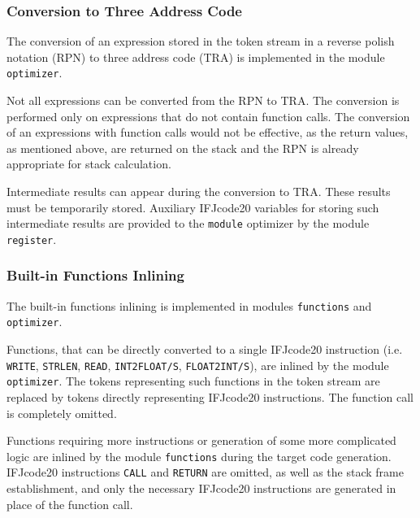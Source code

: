 \documentclass[12pt]{article}
\begin{document}
\subsubsection{Conversion to Three Address Code}
The conversion of an expression stored in the token stream in a reverse polish notation (RPN) to three address code (TRA) is implemented in the module \texttt{optimizer}. \par
Not all expressions can be converted from the RPN to TRA. The conversion is performed only on expressions that do not contain function calls. The conversion of an expressions with function calls would not be effective, as the return values, as mentioned above, are returned on the stack and the RPN is already appropriate for stack calculation.\par
Intermediate results can appear during the conversion to TRA. These results must be temporarily stored. Auxiliary IFJcode20 variables for storing such intermediate results are provided to the \texttt{module} optimizer by the module \texttt{register}. 
\subsubsection{Built-in Functions Inlining}
The built-in functions inlining is implemented in modules \texttt{functions} and \texttt{optimizer}. \par
Functions, that can be directly converted to a single IFJcode20 instruction (i.e. \texttt{WRITE}, \texttt{STRLEN}, \texttt{READ}, \texttt{INT2FLOAT/S}, \texttt{FLOAT2INT/S}), are inlined by the module \texttt{optimizer}. The tokens representing such functions in the token stream are replaced by tokens directly representing IFJcode20 instructions. The function call is completely omitted. \par
Functions requiring more instructions or generation of  some more complicated logic are inlined by the module \texttt{functions} during the target code generation. IFJcode20 instructions \texttt{CALL} and \texttt{RETURN} are omitted, as well as the stack frame establishment, and only the necessary IFJcode20 instructions are generated in place of the function call.
\end{document}
